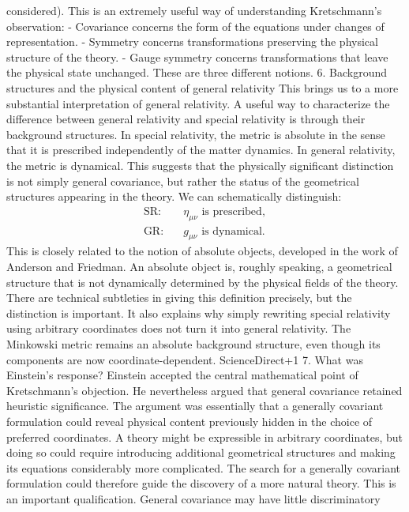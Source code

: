 considered). This is an extremely useful way of understanding Kretschmann's
observation: - Covariance concerns the form of the equations under changes of
representation. - Symmetry concerns transformations preserving the physical
structure of the theory. - Gauge symmetry concerns transformations that leave
the physical state unchanged. These are three different notions. 6. Background
structures and the physical content of general relativity This brings us to a
more substantial interpretation of general relativity. A useful way to
characterize the difference between general relativity and special relativity
is through their background structures. In special relativity, the metric is
absolute in the sense that it is prescribed independently of the matter
dynamics. In general relativity, the metric is dynamical. This suggests that
the physically significant distinction is not simply general covariance, but
rather the status of the geometrical structures appearing in the theory. We can
schematically distinguish: \[ \begin{aligned} \text{SR:}&\quad
\eta_{\mu\nu}\text{ is prescribed},\\ \text{GR:}&\quad g_{\mu\nu}\text{ is
dynamical}. \end{aligned} \] This is closely related to the notion of absolute
objects, developed in the work of Anderson and Friedman. An absolute object is,
roughly speaking, a geometrical structure that is not dynamically determined by
the physical fields of the theory. There are technical subtleties in giving
this definition precisely, but the distinction is important. It also explains
why simply rewriting special relativity using arbitrary coordinates does not
turn it into general relativity. The Minkowski metric remains an absolute
background structure, even though its components are now coordinate-dependent.
ScienceDirect+1 7. What was Einstein's response? Einstein accepted the central
mathematical point of Kretschmann's objection. He nevertheless argued that
general covariance retained heuristic significance. The argument was
essentially that a generally covariant formulation could reveal physical
content previously hidden in the choice of preferred coordinates. A theory
might be expressible in arbitrary coordinates, but doing so could require
introducing additional geometrical structures and making its equations
considerably more complicated. The search for a generally covariant formulation
could therefore guide the discovery of a more natural theory. This is an
important qualification. General covariance may have little discriminatory
